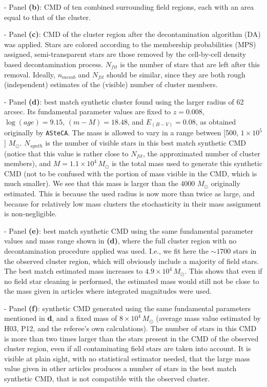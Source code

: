 \documentclass{article}
\begin{document}
\noindent - Panel \textbf{(b)}: CMD of ten combined surrounding field
regions, each with an area equal to that of the cluster.

\noindent - Panel \textbf{(c)}: CMD of the cluster region after the
decontamination algorithm (DA) was applied. Stars are colored according to the
membership probabilities (MPS) assigned, semi-transparent stars are those
removed by the cell-by-cell density based decontamination process.
$N_{fit}$ is the number of stars that are left after this removal.
Ideally, $n_{memb}$ and $N_{fit}$ should be similar, since they are both rough
(independent) estimates of the (visible) number of cluster members.

\noindent - Panel \textbf{(d)}: best match synthetic cluster found using the
larger radius of 62 arcsec.
Its fundamental parameter values are fixed to $z{=}0.008$,
$\log(age){=}9.15$, $(m-M){=}18.48$, and $E_{(B-V)}{=}0.08$, as obtained
originally by \texttt{ASteCA}. The mass is allowed to vary in a range between 
[500, $1{\times}10^5$] $M_{\odot}$.
%
$N_{synth}$ is the number of visible stars in this best match synthetic CMD 
(notice that this value is rather close to $N_{fit}$, the approximated number of
cluster members), and $M{=}1.1{\times}10^4\,M_{\odot}$ is the total mass
used to generate this synthetic CMD (not to be confused with the
portion of mass visible in the CMD, which is much smaller).
We see that this mass is larger than the 4000 $M_{\odot}$ originally estimated.
This is because the used radius is now more than twice as large, and because for
relatively low mass clusters the stochasticity in their mass assignment is
non-negligible.

\noindent - Panel \textbf{(e)}: best match synthetic CMD using the same
fundamental parameter values and mass range shown in \textbf{(d)}, where the
full cluster region with no decontamination procedure applied was used.
I.e., we fit here the $\sim1700$ stars in the observed cluster region, which
will obviously include a majority of field stars.
The best match estimated mass increases to $4.9{\times}10^4\,M_{\odot}$.
This shows that even if no field star cleaning is performed, the estimated mass
would still not be close to the mass given in articles where integrated
magnitudes were used.

\noindent - Panel \textbf{(f)}: synthetic CMD generated using the same
fundamental parameters mentioned in \textbf{d}, and a fixed mass of
$8{\times}10^4\,M_{\odot}$ (average mass value estimated by H03, P12, and the
referee's own calculations).
The number of stars in this CMD is more than two times larger than the stars
present in the CMD of the observed cluster region, even if all
contaminating field stars are taken into account.
It is visible at plain sight, with no statistical estimator needed, that the
large mass value given in other articles produces a number of stars in the best
match synthetic CMD, that is not compatible with the observed
cluster.\\
\end{document}
